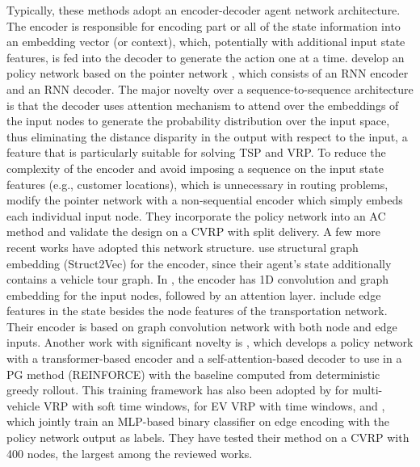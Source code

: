 \documentclass{article}
\begin{document}
Typically, these methods adopt an encoder-decoder agent network architecture. The encoder is responsible for encoding part or all of the state information into an embedding vector (or context), which, potentially with additional input state features, is fed into the decoder to generate the action one at a time. 
\cite{bello2016neural} develop an policy network based on the pointer network \citep{vinyals2015pointer}, which consists of an RNN encoder and an RNN decoder. The major novelty over a sequence-to-sequence architecture is that the decoder uses attention mechanism to attend over the embeddings of the input nodes to generate the probability distribution over the input space, thus eliminating the distance disparity in the output with respect to the input, a feature that is particularly suitable for solving TSP and VRP. To reduce the complexity of the encoder and avoid imposing a sequence on the input state features (e.g., customer locations), which is unnecessary in routing problems, \cite{nazari2018reinforcement} modify the pointer network with a non-sequential encoder which simply embeds each individual input node. They incorporate the policy network into an AC method and validate the design on a CVRP with split delivery. A few more recent works have adopted this network structure. \cite{james2019online} use structural graph embedding (Struct2Vec) for the encoder, since their agent's state additionally contains a vehicle tour graph. 
In \citep{lin2021deep}, the encoder has 1D convolution and graph embedding for the input nodes, followed by an attention layer. \cite{duan2020efficiently} include edge features in the state besides the node features of the transportation network. Their encoder is based on graph convolution network with both node and edge inputs.  Another work with significant novelty is \citep{kool2018attention}, which develops a policy network with a transformer-based encoder and a self-attention-based decoder to use in a PG method (REINFORCE) with the baseline computed from deterministic greedy rollout. This training framework has also been adopted by \cite{zhang2020multi} for multi-vehicle VRP with soft time windows, \cite{lin2021deep} for EV VRP with time windows, and \cite{duan2020efficiently}, which jointly train an MLP-based binary classifier on edge encoding with the policy network output as labels. They have tested their method on a CVRP with 400 nodes, the largest among the reviewed works.
\end{document}
